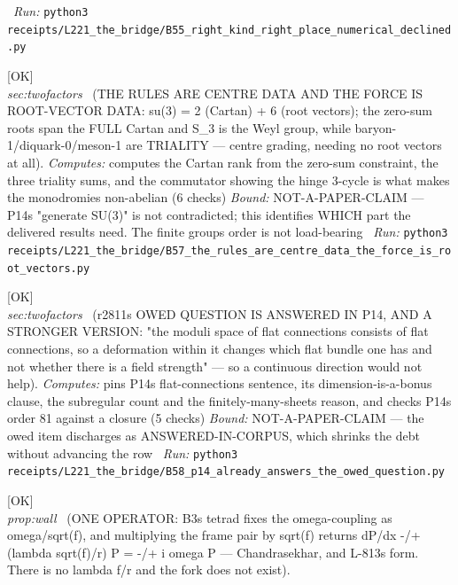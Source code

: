 \begin{description}
\ \emph{Run:} \texttt{python3 receipts/L221\_the\_bridge/B55\_right\_kind\_right\_place\_numerical\_declined.py}
\item[\label{rcpt:B57_the_rules_are_centre_data_the_force_is_root_vectors}\textbf{}\quad\texttt{B57\_the\_rules\_are\_centre\_data\_the\_force\_is\_root\_vectors}]\hfill\textsf{[OK]}\\
\textit{sec:twofactors} \ (THE RULES ARE CENTRE DATA AND THE FORCE IS ROOT-VECTOR DATA: su(3) = 2 (Cartan) + 6 (root vectors); the zero-sum roots span the FULL Cartan and S\_3 is the Weyl group, while baryon-1/diquark-0/meson-1 are TRIALITY --- centre grading, needing no root vectors at all). 
\emph{Computes:} computes the Cartan rank from the zero-sum constraint, the three triality sums, and the commutator showing the hinge 3-cycle is what makes the monodromies non-abelian (6 checks)
 \emph{Bound:} NOT-A-PAPER-CLAIM --- P14s "generate SU(3)" is not contradicted; this identifies WHICH part the delivered results need. The finite groups order is not load-bearing
\ \emph{Run:} \texttt{python3 receipts/L221\_the\_bridge/B57\_the\_rules\_are\_centre\_data\_the\_force\_is\_root\_vectors.py}
\item[\label{rcpt:B58_p14_already_answers_the_owed_question}\textbf{}\quad\texttt{B58\_p14\_already\_answers\_the\_owed\_question}]\hfill\textsf{[OK]}\\
\textit{sec:twofactors} \ (r2811s OWED QUESTION IS ANSWERED IN P14, AND A STRONGER VERSION: "the moduli space of flat connections consists of flat connections, so a deformation within it changes which flat bundle one has and not whether there is a field strength" --- so a continuous direction would not help). 
\emph{Computes:} pins P14s flat-connections sentence, its dimension-is-a-bonus clause, the subregular count and the finitely-many-sheets reason, and checks P14s order 81 against a closure (5 checks)
 \emph{Bound:} NOT-A-PAPER-CLAIM --- the owed item discharges as ANSWERED-IN-CORPUS, which shrinks the debt without advancing the row
\ \emph{Run:} \texttt{python3 receipts/L221\_the\_bridge/B58\_p14\_already\_answers\_the\_owed\_question.py}
\item[\label{rcpt:B60_one_operator_the_fork_does_not_exist}\textbf{}\quad\texttt{B60\_one\_operator\_the\_fork\_does\_not\_exist}]\hfill\textsf{[OK]}\\
\textit{prop:wall} \ (ONE OPERATOR: B3s tetrad fixes the omega-coupling as omega/sqrt(f), and multiplying the frame pair by sqrt(f) returns dP/dx -/+ (lambda sqrt(f)/r) P = -/+ i omega P --- Chandrasekhar, and L-813s form. There is no lambda f/r and the fork does not exist). 

\end{description}
